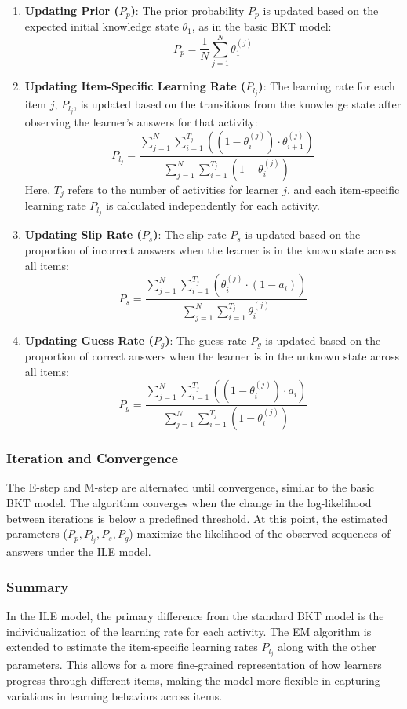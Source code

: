 \documentclass{article}
\begin{document}
\begin{enumerate}
    \item \textbf{Updating Prior (\(P_p\))}:
    The prior probability \(P_p\) is updated based on the expected initial knowledge state \(\theta_1\), as in the basic BKT model:
    \[
    P_p = \frac{1}{N} \sum_{j=1}^N \theta_1^{(j)}
    \]

    \item \textbf{Updating Item-Specific Learning Rate (\(P_{l_j}\))}:
    The learning rate for each item \(j\), \(P_{l_j}\), is updated based on the transitions from the knowledge state after observing the learner's answers for that activity:
    \[
    P_{l_j} = \frac{\sum_{j=1}^N \sum_{i=1}^{T_j} \left( (1 - \theta_i^{(j)}) \cdot \theta_{i+1}^{(j)} \right)}{\sum_{j=1}^N \sum_{i=1}^{T_j} (1 - \theta_i^{(j)})}
    \]
    Here, \(T_j\) refers to the number of activities for learner \(j\), and each item-specific learning rate \(P_{l_j}\) is calculated independently for each activity.

    \item \textbf{Updating Slip Rate (\(P_s\))}:
    The slip rate \(P_s\) is updated based on the proportion of incorrect answers when the learner is in the known state across all items:
    \[
    P_s = \frac{\sum_{j=1}^N \sum_{i=1}^{T_j} \left( \theta_i^{(j)} \cdot (1 - a_i) \right)}{\sum_{j=1}^N \sum_{i=1}^{T_j} \theta_i^{(j)}}
    \]

    \item \textbf{Updating Guess Rate (\(P_g\))}:
    The guess rate \(P_g\) is updated based on the proportion of correct answers when the learner is in the unknown state across all items:
    \[
    P_g = \frac{\sum_{j=1}^N \sum_{i=1}^{T_j} \left( (1 - \theta_i^{(j)}) \cdot a_i \right)}{\sum_{j=1}^N \sum_{i=1}^{T_j} (1 - \theta_i^{(j)})}
    \]
\end{enumerate}

\subsubsection{Iteration and Convergence}
The E-step and M-step are alternated until convergence, similar to the basic BKT model. The algorithm converges when the change in the log-likelihood between iterations is below a predefined threshold. At this point, the estimated parameters (\(P_p, P_{l_j}, P_s, P_g\)) maximize the likelihood of the observed sequences of answers under the ILE model.

\subsubsection{Summary}
In the ILE model, the primary difference from the standard BKT model is the individualization of the learning rate for each activity. The EM algorithm is extended to estimate the item-specific learning rates \(P_{l_j}\) along with the other parameters. This allows for a more fine-grained representation of how learners progress through different items, making the model more flexible in capturing variations in learning behaviors across items.
\end{document}
